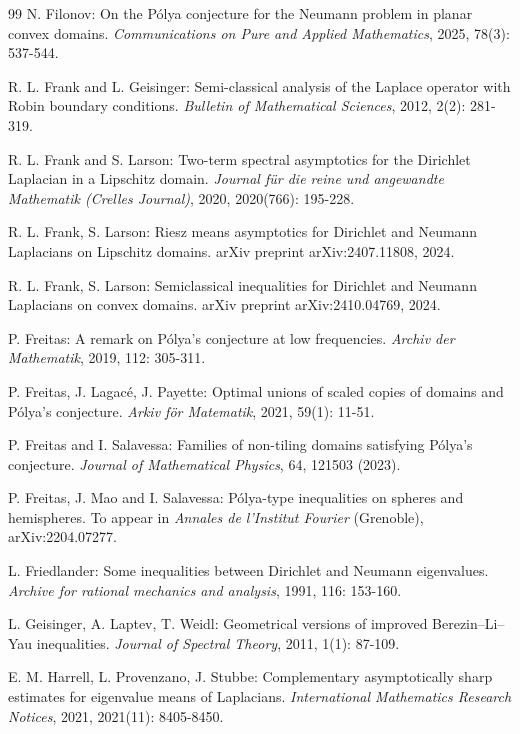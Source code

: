 \documentclass[11pt,letterpaper]{amsart}
\numberwithin{equation}{section}
\theoremstyle{plain}
\theoremstyle{plain}
\numberwithin{equation}{section}
\theoremstyle{remark}
\begin{document}
\begin{thebibliography}{99}
	N. Filonov: On the P\'olya conjecture for the Neumann problem in planar convex domains. \emph{Communications on Pure and Applied Mathematics}, 2025, 78(3): 537-544.
	
	R. L. Frank and L. Geisinger: Semi-classical analysis of the Laplace operator with Robin boundary conditions. \emph{Bulletin of Mathematical Sciences}, 2012, 2(2): 281-319.
	
	R. L. Frank and S. Larson: Two-term spectral asymptotics for the Dirichlet Laplacian in a Lipschitz domain. \emph{Journal f\"ur die reine und angewandte Mathematik (Crelles Journal)}, 2020, 2020(766): 195-228.
	
	R. L. Frank, S. Larson: Riesz means asymptotics for Dirichlet and Neumann Laplacians on Lipschitz domains. arXiv preprint arXiv:2407.11808, 2024.
	
	R. L. Frank, S. Larson: Semiclassical inequalities for Dirichlet and Neumann Laplacians on convex domains. arXiv preprint arXiv:2410.04769, 2024. 
	
	P. Freitas: A remark on P\'olya’s conjecture at low frequencies. \emph{Archiv der Mathematik}, 2019, 112: 305-311.
	
	P. Freitas, J. Lagac\'e, J. Payette: Optimal unions of scaled copies of domains and P\'olya's conjecture. \emph{Arkiv f\"or Matematik}, 2021, 59(1): 11-51.
	
	P. Freitas and I. Salavessa: Families of non-tiling domains satisfying P\'olya's conjecture. \emph{Journal of Mathematical Physics}, 64, 121503 (2023).
	
	P. Freitas, J. Mao and I. Salavessa: P\'olya-type inequalities on spheres and hemispheres. To appear in \emph{Annales de l'Institut Fourier} (Grenoble), arXiv:2204.07277.%
	
	L. Friedlander: Some inequalities between Dirichlet and Neumann eigenvalues. \emph{Archive for rational mechanics and analysis}, 1991, 116: 153-160.
	
	
	L. Geisinger, A. Laptev, T. Weidl: Geometrical versions of improved Berezin–Li–Yau inequalities. \emph{Journal of Spectral Theory}, 2011, 1(1): 87-109.
	 
	E. M. Harrell, L. Provenzano, J. Stubbe: Complementary asymptotically sharp estimates for eigenvalue means of Laplacians. \emph{International Mathematics Research Notices}, 2021, 2021(11): 8405-8450.


\end{thebibliography}
\end{document}
